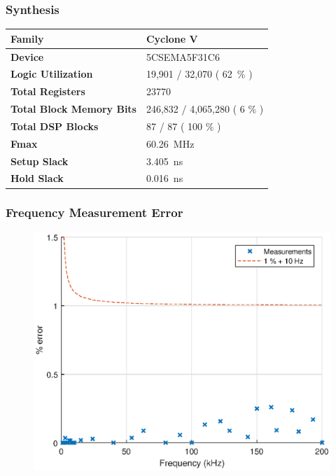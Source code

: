 \documentclass[pdf]{beamer}
\begin{document}
\begin{frame}
\frametitle{Synthesis}
\begin{table}[!htb]
    \centering
    \begin{tabular}[c]{ | l | l | }
    	\hline
        \textbf{Family} & Cyclone V \\
        \hline
        \textbf{Device} & 5CSEMA5F31C6 \\
        \hline
        \textbf{Logic Utilization} & 19,901 / 32,070 ( 62~\% ) \\
        \hline
        \textbf{Total Registers} & 23770 \\
        \hline
        \textbf{Total Block Memory Bits} & 246,832 / 4,065,280 ( 6 \% ) \\
        \hline
        \textbf{Total DSP Blocks} & 87 / 87 ( 100 \% ) \\
        \hline
        \textbf{Fmax} & 60.26~MHz \\
        \hline
        \textbf{Setup Slack} & 3.405~ns \\
        \hline
        \textbf{Hold Slack} & 0.016~ns \\
        \hline
    \end{tabular}
\end{table}
\end{frame}

\begin{frame}
\frametitle{Frequency Measurement Error}
\begin{figure}[!htb]
  \includegraphics[height=0.8\textheight]{test-results/freq.eps}
\end{figure}
\end{frame}
\end{document}
